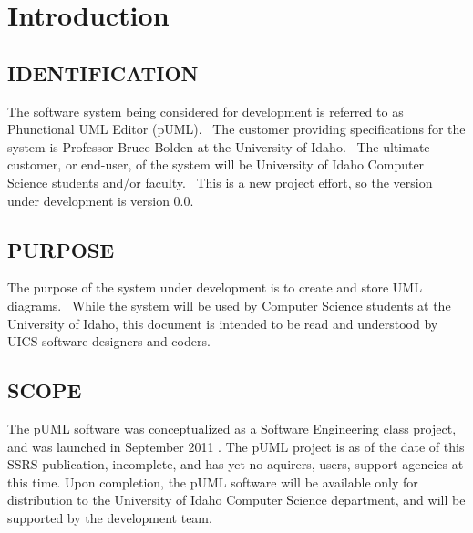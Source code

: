 \documentclass[twoside,letterpaper]{article}
\begin{document}
\setcounter{tocdepth}{9}
\renewcommand\contentsname{}
\tableofcontents

\bigskip








\clearpage\clearpage\setcounter{page}{1}\pagestyle{Convertii}
\section[Introduction]{\rmfamily\bfseries\color{black}
Introduction}

\subsection[IDENTIFICATION]{\rmfamily\bfseries\color{black}
IDENTIFICATION}
{\color{black}
The software system being considered for development is referred to as Phunctional UML Editor (pUML). \ The customer providing specifications
for the system is Professor Bruce Bolden at the University of Idaho. \ The ultimate
customer, or end-user, of the system will be University of Idaho Computer Science students and/or faculty. \ This is a new project effort, so the version under development is version 0.0.}

\subsection[PURPOSE]{\rmfamily\bfseries\color{black}
PURPOSE}
{\color{black}
The purpose of the system under development is to create and store UML diagrams.
\ While the system will be used by Computer Science students at the University of Idaho,
this document is intended to be read and understood by UICS software
designers and coders.}

\subsection[SCOPE]{\rmfamily\bfseries\color{black}
SCOPE}
{\color{black}
The pUML software was conceptualized as a Software Engineering class project, and was launched in September 2011 .  The pUML project is as of the date of this SSRS publication, incomplete, and has yet no aquirers, users, support agencies at this time. Upon completion, the pUML software will be available only for distribution to the University of Idaho Computer Science department, and will be supported by the development team. }
\end{document}
